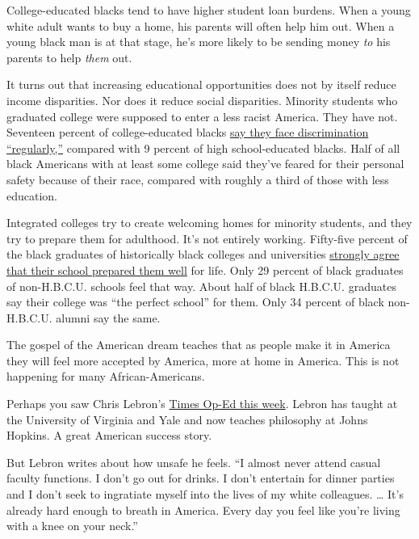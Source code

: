 College-educated blacks tend to have higher student loan burdens. When a
young white adult wants to buy a home, his parents will often help him
out. When a young black man is at that stage, he's more likely to be
sending money \emph{to} his parents to help \emph{them} out.

It turns out that increasing educational opportunities does not by
itself reduce income disparities. Nor does it reduce social disparities.
Minority students who graduated college were supposed to enter a less
racist America. They have not. Seventeen percent of college-educated
blacks
\href{https://www.pewresearch.org/fact-tank/2019/05/02/for-black-americans-experiences-of-racial-discrimination-vary-by-education-level-gender/}{say
they face discrimination ``regularly,''} compared with 9 percent of high
school-educated blacks. Half of all black Americans with at least some
college said they've feared for their personal safety because of their
race, compared with roughly a third of those with less education.

Integrated colleges try to create welcoming homes for minority students,
and they try to prepare them for adulthood. It's not entirely working.
Fifty-five percent of the black graduates of historically black colleges
and universities
\href{https://www.insidehighered.com/news/2015/10/28/survey-finds-big-differences-between-black-hbcu-graduates-those-who-attended-other\#:~:text=Black\%20graduates\%20of\%20historically\%20black,ongoing\%20Gallup\%2DPurdue\%20University\%20study.}{strongly
agree that their school prepared them well} for life. Only 29 percent of
black graduates of non-H.B.C.U. schools feel that way. About half of
black H.B.C.U. graduates say their college was ``the perfect school''
for them. Only 34 percent of black non-H.B.C.U. alumni say the same.

The gospel of the American dream teaches that as people make it in
America they will feel more accepted by America, more at home in
America. This is not happening for many African-Americans.

Perhaps you saw Chris Lebron's
\href{https://www.nytimes3xbfgragh.onion/2020/06/16/opinion/black-academia-racism.html}{Times
Op-Ed this week}. Lebron has taught at the University of Virginia and
Yale and now teaches philosophy at Johns Hopkins. A great American
success story.

But Lebron writes about how unsafe he feels. ``I almost never attend
casual faculty functions. I don't go out for drinks. I don't entertain
for dinner parties and I don't seek to ingratiate myself into the lives
of my white colleagues. \ldots{} It's already hard enough to breath in
America. Every day you feel like you're living with a knee on your
neck.''

